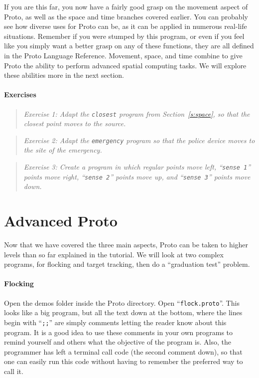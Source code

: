 \documentclass{article}
\newcommand\problem[1]{\begin{quote}{\em #1}\end{quote}}
\newcommand\var[1]{{\tt #1}}
\newcommand\qvar[1]{``{\tt #1}''}
\begin{document}
If you are this far, you now have a fairly good grasp on the movement
aspect of Proto, as well as the space and time branches covered
earlier.  You can probably see how diverse uses for Proto can be, as
it can be applied in numerous real-life situations.  Remember if you
were stumped by this program, or even if you feel like you simply want
a better grasp on any of these functions, they are all defined in the
Proto Language Reference.  Movement, space, and time combine to give
Proto the ability to perform advanced spatial computing tasks.  We
will explore these abilities more in the next section.

\paragraph{Exercises}

\problem{Exercise 1: Adapt the \var{closest} program from
  Section~\ref{s:space}, so that the closest point moves to the
  source.}

\problem{Exercise 2: Adapt the \var{emergency} program so that the
  police device moves to the site of the emergency.}

\problem{Exercise 3: Create a program in which regular points move
  left, \qvar{sense 1} points move right, \qvar{sense 2} points move
  up, and \qvar{sense 3} points move down.}


\section{Advanced Proto}

Now that we have covered the three main aspects, Proto can be taken to
higher levels than so far explained in the tutorial.  We will look at
two complex programs, for flocking and target tracking, then do a 
``graduation test'' problem.

\paragraph{Flocking}
Open the demos folder inside the Proto directory.  Open
\qvar{flock.proto}.  This looks like a big program, but all the text
down at the bottom, where the lines begin with \qvar{;;} are simply
comments letting the reader know about this program.  It is a good
idea to use these comments in your own programs to remind yourself and
others what the objective of the program is.  Also, the programmer has
left a terminal call code (the second comment down), so that one can
easily run this code without having to remember the preferred way to
call it.
\end{document}
